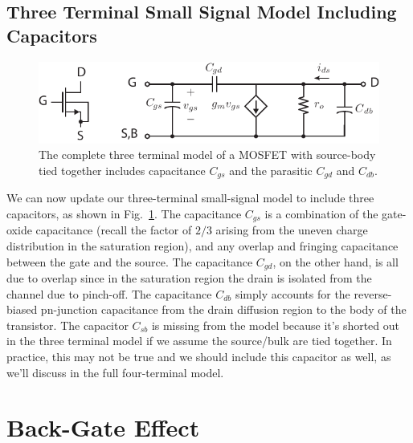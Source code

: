 \subsection{Three Terminal Small Signal Model Including Capacitors}
\begin{figure}[tb]
\centering
\includegraphics[scale=1]{mos3term_ac}
\caption{The complete three terminal model of a MOSFET with source-body tied together includes  capacitance $C_{gs}$ and the parasitic $C_{gd}$ and $C_{db}$.}
\label{fig:mos3term_ac}
\end{figure}
We can now update our three-terminal small-signal model to include three capacitors, as shown in Fig.~\ref{fig:mos3term_ac}.  The capacitance $C_{gs}$ is a combination of the gate-oxide capacitance (recall the factor of $2/3$ arising from the uneven charge distribution in the saturation region), and any overlap and fringing capacitance between the gate and the source.  The capacitance $C_{gd}$, on the other hand, is all due to overlap since in the saturation region the drain is isolated from the channel due to pinch-off.  The capacitance $C_{db}$ simply accounts for the reverse-biased pn-junction capacitance from the drain diffusion region to the body of the transistor.  The capacitor $C_{sb}$ is missing from the model because it's shorted out in the three terminal model if we assume the source/bulk are tied together.  In practice, this may not be true and we should include this capacitor as well, as we'll discuss in the full four-terminal model.  
\section{Back-Gate Effect}
